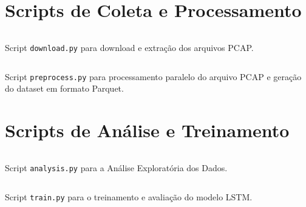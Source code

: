 \clearpage
\appendix

\section{Scripts de Coleta e Processamento}

\begin{ghostbox}
    \captionsetup{type=listing}
    \inputminted[samepage=false]{python}{../network_traffic_predictor/download.py}
    \caption{Script \texttt{download.py} para download e extração dos arquivos PCAP.}
    \label{lst:script-download}
\end{ghostbox}

\begin{ghostbox}
    \captionsetup{type=listing}
    \inputminted[samepage=false]{python}{../network_traffic_predictor/preprocess.py}
    \caption{Script \texttt{preprocess.py} para processamento paralelo do arquivo PCAP e geração do dataset
    em formato Parquet.}
    \label{lst:script-preprocess}
\end{ghostbox}

\section{Scripts de Análise e Treinamento}

\begin{ghostbox}
    \captionsetup{type=listing}
    \inputminted[samepage=false]{python}{../network_traffic_predictor/analysis.py}
    \caption{Script \texttt{analysis.py} para a Análise Exploratória dos Dados.}
    \label{lst:script-analysis}
\end{ghostbox}

\begin{ghostbox}
    \captionsetup{type=listing}
    \inputminted[samepage=false]{python}{../network_traffic_predictor/train.py}
    \caption{Script \texttt{train.py} para o treinamento e avaliação do modelo LSTM.}
    \label{lst:script-train}
\end{ghostbox}
